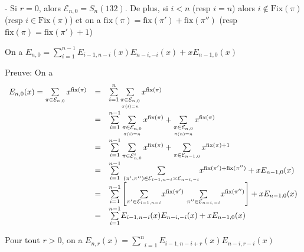 - Si $r=0$, alors $\mathcal{E}_{n, 0} = S_{n}(132)$. De plus, si $i<n$ (resp $i=n$) alors $i\notin \text{Fix}(\pi)$ \\(resp $i \in \text{Fix}(\pi)$) et on a $\text{fix}(\pi) = \text{fix}(\pi') + \text{fix}(\pi'')$ (resp  $\text{fix}(\pi) = \text{fix}(\pi') + 1$)
\begin{proposition}\label{p8}
	On a $E_{n, 0} = \sum\limits_{i=1}^{n-1}E_{i-1, n-i}(x)E_{n-i, -i}(x) + xE_{n-1, 0}(x)$
\end{proposition}
Preuve: On a
\[
	\begin{array}{l l l}
		E_{n, 0}(x) = \sum\limits_{\pi \in \mathcal{E}_{n, 0}}x^{\text{fix}(\pi)} & = & \sum\limits_{i=1}^{n} \sum\limits_{\underset{\pi(i)=n }{\pi \in \mathcal{E}_{n,0} }} x^{\text{fix}(\pi)}                                                                                                   \\
		                                                                   & = & \sum\limits_{i=1}^{n-1} \sum\limits_{\underset{\pi(i)=n }{\pi \in \mathcal{E}_{n,0} }} x^{\text{fix}(\pi)} + \sum\limits_{\underset{\pi(n)=n }{\pi \in \mathcal{E}_{n,0} }}x^{\text{fix}(\pi)}                    \\
		                                                                   & = & \sum\limits_{i=1}^{n-1} \sum\limits_{\pi \in \mathcal{E}_{n,0}^{i} } x^{\text{fix}(\pi)} + \sum\limits_{\pi \in \mathcal{E}_{n-1,0} }x^{\text{fix}(\pi)+1}                                                        \\
		                                                                   & = & \underset{i=1}{\overset{n-1}{\sum}} \text{ } \underset{(\pi', \pi'') \in \mathcal{E}_{i-1,n-i}\times \mathcal{E}_{n-i,-i}}{\sum}x^{\text{fix}(\pi') + \text{fix}(\pi'')} + xE_{n-1,0}(x)                          \\
		                                                                   & = & \underset{i=1}{\overset{n-1}{\sum}}\left[ \underset{\pi' \in \mathcal{E}_{i-1,n-i}}{\sum}x^{\text{fix}(\pi')}\text{ }\underset{\pi'' \in \mathcal{E}_{n-i,-i}}{\sum}x^{\text{fix}(\pi'')} \right] + xE_{n-1,0}(x) \\
		                                                                   & = & \underset{i=1}{\overset{n-1}{\sum}}E_{i-1,n-i}(x)E_{n-i,-i}(x) +  xE_{n-1,0}(x)
	\end{array}
\]
\begin{proposition}\label{p9}
	Pour tout $r>0$, on a $E_{n,r}(x) = \underset{i=1}{\overset{n}{\sum}}E_{i-1,n-i+r}(x)E_{n-i,r-i}(x)$
\end{proposition}
